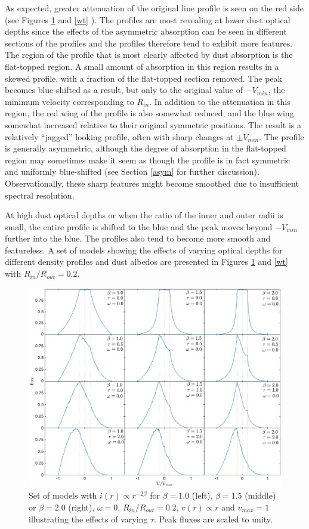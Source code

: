 As expected, greater attenuation of the original line profile is seen on 
the red side (see Figures \ref{bt} and \ref{wt} ).  The profiles are most 
revealing at lower dust optical depths since the effects of the asymmetric 
absorption can be seen in different sections of the profiles and the 
profiles therefore tend to exhibit more features. The region of the 
profile that is most clearly affected by dust absorption is the 
flat-topped region.  A small amount of absorption in this region results 
in a skewed profile, with a fraction of the flat-topped section removed.  
The peak becomes blue-shifted as a result, but only to the original value 
of $-V_{min}$, the minimum velocity corresponding to $R_{in}$. In addition 
to the attenuation in this region, the red wing of the profile is also 
somewhat reduced, and the blue wing somewhat increased relative to their 
original symmetric positions.  The result is a relatively ``jagged'' 
looking profile, often with sharp changes at $\pm V_{min}$.  The profile 
is generally asymmetric, although the degree of absorption in the 
flat-topped region may sometimes make it seem as though the profile is in 
fact symmetric and uniformly blue-shifted (see Section \ref{asym} for 
further discussion).  Observationally, these sharp features might become 
smoothed due to insufficient spectral resolution.

At high dust optical depths or when the ratio of the inner and outer radii 
is small, the entire profile is shifted to the blue and the peak moves 
beyond $-V_{min}$ further into the blue.  The profiles also tend to become 
more smooth and featureless.  A set of models showing the effects of 
varying optical depths for different density profiles and dust albedos are 
presented in Figures \ref{bt} and \ref{wt} with $R_{in}/R_{out} = 0.2$.

\begin{figure}
\centering
\includegraphics[trim =77 0 6 15,clip=true,scale=0.44]{chapters/chapter4/images/params/D/D_all2}
\caption{Set of models with $i(r) \propto r^{-2\beta}$ for $\beta=1.0$ (left), $\beta=1.5$ (middle) or $\beta=2.0$ (right), $\omega=0$, 
$R_{in}/R_{out}=0.2$, $v(r) \propto r$ and $v_{max}=1$ illustrating the effects of varying 
$\tau$.  Peak fluxes are scaled to unity.}
\label{bt}
\end{figure}


